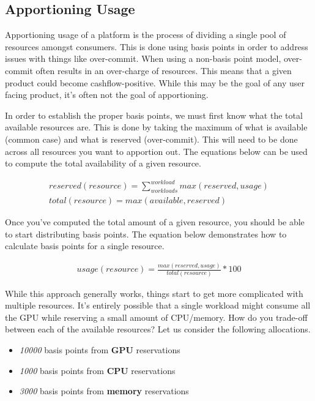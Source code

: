 \documentclass[10pt, a4paper, twocolumn]{article}
\begin{document}
  \subsection*{Apportioning Usage}
    Apportioning usage of a platform is the process of dividing a single pool of resources amongst consumers.
    This is done using basis points in order to address issues with things like over-commit.
    When using a non-basis point model, over-commit often results in an over-charge of resources.
    This means that a given product could become cashflow-positive.
    While this may be the goal of any user facing product, it's often not the goal of apportioning.

    In order to establish the proper basis points, we must first know what the total available resources are.
    This is done by taking the maximum of what is available (common case) and what is reserved (over-commit).
    This will need to be done across all resources you want to apportion out.
    The equations below can be used to compute the total availability of a given resource.

    \begin{gather*}
      reserved(resource) = \sum^{workload}_{workloads} max(reserved, usage) \\
      total(resource) = max(available, reserved)
    \end{gather*}

    Once you've computed the total amount of a given resource, you should be able to start distributing basis points.
    The equation below demonstrates how to calculate basis points for a single resource.

    \begin{gather*}
      usage(resource) = \frac{max(reserved, usage)}{total(resource)} * 100
    \end{gather*}

    While this approach generally works, things start to get more complicated with multiple resources.
    It's entirely possible that a single workload might consume all the GPU while reserving a small amount of CPU/memory.
    How do you trade-off between each of the available resources?
    Let us consider the following allocations.

    \begin{itemize}
      \item \textit{10000} basis points from \textbf{GPU} reservations
      \item \textit{1000} basis points from \textbf{CPU} reservations
      \item \textit{3000} basis points from \textbf{memory} reservations
    \end{itemize}
\end{document}
